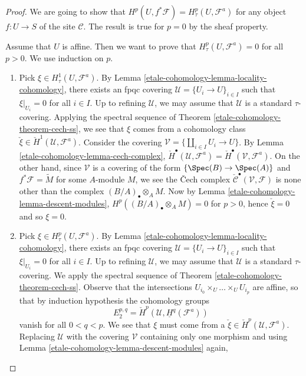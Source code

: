 \begin{proof}
We are going to show that
$H^p(U, f^*\mathcal{F}) = H^p_\tau(U, \mathcal{F}^a)$
for any object $f : U \to S$ of the site $\mathcal{C}$.
The result is true for $p = 0$ by the sheaf property.

\medskip\noindent
Assume that $U$ is affine. Then we want to prove that
$H^p_\tau(U, \mathcal{F}^a) = 0$ for all $p > 0$. We use induction on $p$.
\begin{enumerate}
\item[p = 1]
Pick $\xi \in H^1_\tau(U, \mathcal{F}^a)$.
By Lemma \ref{etale-cohomology-lemma-locality-cohomology},
there exists an fpqc covering $\mathcal{U} = \{U_i \to U\}_{i \in I}$
such that $\xi|_{U_i} = 0$ for all $i \in I$. Up to refining
$\mathcal{U}$, we may assume that $\mathcal{U}$ is a standard
$\tau$-covering. Applying the spectral sequence of
Theorem \ref{etale-cohomology-theorem-cech-ss},
we see that $\xi$ comes from a cohomology class
$\check \xi \in \check H^1(\mathcal{U}, \mathcal{F}^a)$.
Consider the covering $\mathcal{V} = \{\coprod_{i\in I} U_i \to U\}$. By
Lemma \ref{etale-cohomology-lemma-cech-complex},
$\check H^\bullet(\mathcal{U}, \mathcal{F}^a) =
\check H^\bullet(\mathcal{V}, \mathcal{F}^a)$.
On the other hand, since $\mathcal{V}$ is a covering of the form
$\{\Spec(B) \to \Spec(A)\}$ and $f^*\mathcal{F} = \widetilde{M}$
for some $A$-module $M$, we see the {\v C}ech complex
$\check{\mathcal{C}}^\bullet(\mathcal{V}, \mathcal{F})$
is none other than the complex $(B/A)_\bullet \otimes_A M$.
Now by Lemma \ref{etale-cohomology-lemma-descent-modules},
$H^p((B/A)_\bullet \otimes_A M) = 0$ for $p > 0$, hence $\check \xi = 0$
and so $\xi = 0$.
\item[p > 1]
Pick $\xi \in H^p_\tau(U, \mathcal{F}^a)$. By
Lemma \ref{etale-cohomology-lemma-locality-cohomology},
there exists an fpqc covering $\mathcal{U} = \{U_i \to U\}_{i \in I}$
such that $\xi|_{U_i} = 0$ for all $i \in I$. Up to refining
$\mathcal{U}$, we may assume that $\mathcal{U}$ is a standard
$\tau$-covering. We apply the spectral sequence of
Theorem \ref{etale-cohomology-theorem-cech-ss}.
Observe that the intersections $U_{i_0} \times_U \ldots \times_U U_{i_p}$
are affine, so that by induction hypothesis the cohomology groups
$$
E_2^{p, q} = \check H^p(\mathcal{U}, \underline{H}^q(\mathcal{F}^a))
$$
vanish for all $0 < q < p$. We see that $\xi$ must come from a
$\check \xi \in \check H^p(\mathcal{U}, \mathcal{F}^a)$. Replacing
$\mathcal{U}$ with the covering $\mathcal{V}$ containing only one morphism
and using Lemma \ref{etale-cohomology-lemma-descent-modules} again,

\end{enumerate}
\end{proof}
